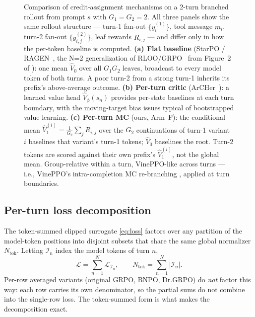 \documentclass[11pt,a4paper]{article}
\begin{document}
\begin{figure}[t]
{\begin{tikzpicture}
\end{tikzpicture}%
}
\caption{Comparison of credit-assignment mechanisms on a 2-turn
branched rollout from prompt $s$ with $G_1{=}G_2{=}2$. All three
panels show the same rollout structure --- turn-1 fan-out
$\{y^{(1)}_i\}$, tool message $m_i$, turn-2 fan-out
$\{y^{(2)}_{i,j}\}$, leaf rewards $R_{i,j}$ --- and differ only in
how the per-token baseline is computed.
\textbf{(a) Flat baseline} (StarPO / RAGEN~\cite{wang2025ragen}, the
N=2 generalization of RLOO/GRPO~\cite{shao2024deepseekmath} from
Figure~2 of \cite{kazemnejad2024vineppo}): one mean $\widehat V_0$
over all $G_1 G_2$ leaves, broadcast to every model token of both
turns. A poor turn-2 from a strong turn-1 inherits its prefix's
above-average outcome.
\textbf{(b) Per-turn critic} (ArCHer~\cite{zhou2024archer}): a
learned value head $\widehat V_\phi(s_n)$ provides per-state
baselines at each turn boundary, with the moving-target bias issues
typical of bootstrapped value learning.
\textbf{(c) Per-turn MC} (ours, Arm~F): the conditional mean
$\widehat V_1^{(i)} = \tfrac{1}{G_2}\sum_j R_{i,j}$ over the $G_2$
continuations of turn-1 variant $i$ baselines that variant's turn-1
tokens; $\widehat V_0$ baselines the root. Turn-2 tokens are scored
against their own prefix's $\widehat V_1^{(i)}$, not the global
mean. Group-relative within a turn, VinePPO-like across turns ---
i.e., VinePPO's intra-completion MC re-branching
\cite{kazemnejad2024vineppo}, applied at turn boundaries.}
\label{fig:credit-assignment}
\end{figure}

\subsection{Per-turn loss decomposition}
\label{sec:per-turn-decomp}

The token-summed clipped surrogate \eqref{eq:loss} factors over any
partition of the model-token positions into disjoint subsets that
share the same global normalizer $N_{\text{tok}}$. Letting
$\mathcal{I}_n$ index the model tokens of turn $n$,
\begin{equation}
  \mathcal{L} = \sum_{n=1}^{N} \mathcal{L}_{\mathcal{I}_n},
  \qquad N_{\text{tok}} = \sum_{n=1}^{N} |\mathcal{I}_n|.
\label{eq:additive}
\end{equation}
Per-row averaged variants (original GRPO, BNPO, Dr.GRPO) do
\emph{not} factor this way: each row carries its own denominator,
so the partial sums do not combine into the single-row loss. The
token-summed form is what makes the decomposition exact.
\end{document}
